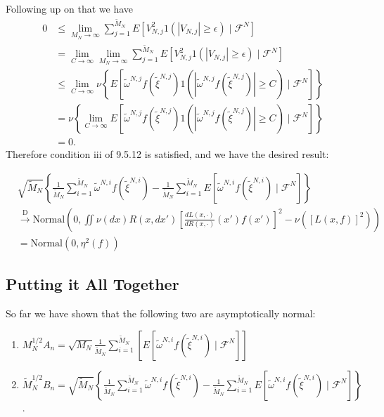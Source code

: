 \documentclass{article}
\begin{document}
Following up on that we have 
\begin{align*}
0 &\le \lim_{M_N \to \infty} \sum_{j=1}^{\tilde{M}_N} E[V_{N,j}^2 1\left( |V_{N,j}| \ge \epsilon \right) \mid \mathcal{F}^N] \\
&= \lim_{C \to \infty} \lim_{M_N \to \infty} \sum_{j=1}^{\tilde{M}_N} E[V_{N,j}^2 1\left( |V_{N,j}| \ge \epsilon \right) \mid \mathcal{F}^N] \tag{no $C$ so limit doesn't matter}\\
&\le \lim_{C \to \infty} \nu\left\{ E[ \tilde{\omega}^{N,j} f(\tilde{\xi}^{N,j}) 1\left( |\tilde{\omega}^{N,j} f(\tilde{\xi}^{N,j})| \ge C \right) \mid \mathcal{F}^N] \right\} \tag{above work} \\
&= \nu\left\{ \lim_{C \to \infty} E[ \tilde{\omega}^{N,j} f(\tilde{\xi}^{N,j}) 1\left( |\tilde{\omega}^{N,j} f(\tilde{\xi}^{N,j})| \ge C \right) \mid \mathcal{F}^N] \right\} \tag{DCT} \\
&= 0.
\end{align*}
Therefore condition iii of 9.5.12 is satisfied, and we have the desired result:


\begin{align*}
& \sqrt{\tilde{M}_N}\left\{  \frac{1}{\tilde{M}_N} \sum_{i=1}^{\tilde{M}_N} \tilde{\omega}^{N,i} f(\tilde{\xi}^{N,i}) -  \frac{1}{\tilde{M}_N} \sum_{i=1}^{\tilde{M}_N} E[ \tilde{\omega}^{N,i} f(\tilde{\xi}^{N,i}) \mid \mathcal{F}^N] \right\} \\
& \overset{\text{D}}{\to}
\text{Normal}\left( 0, 
\iint \nu(dx) R(x,dx')\left[ \frac{dL(x,\cdot)}{dR(x,\cdot)}(x') f(x') \right]^2
-\nu\left(\left[L(x,f) \right]^2\right)\right) \\
& =
\text{Normal}\left( 0, 
\eta^2(f)\right)
\end{align*}



\subsection{Putting it All Together}


So far we have shown that the following two are asymptotically normal:
\begin{enumerate}
\item $M_N^{1/2}A_n = \sqrt{M_N} \frac{1}{\tilde{M}_N} \sum_{i=1}^{\tilde{M}_N} \left[ E[ \tilde{\omega}^{N,i} f(\tilde{\xi}^{N,i}) \mid \mathcal{F}^N]  \right]$
\item $\tilde{M}_N^{1/2} B_n = \sqrt{\tilde{M}_N}\left\{  \frac{1}{\tilde{M}_N} \sum_{i=1}^{\tilde{M}_N} \tilde{\omega}^{N,i} f(\tilde{\xi}^{N,i}) -  \frac{1}{\tilde{M}_N} \sum_{i=1}^{\tilde{M}_N} E[ \tilde{\omega}^{N,i} f(\tilde{\xi}^{N,i}) \mid \mathcal{F}^N] \right\} $.
\end{enumerate}
\end{document}
